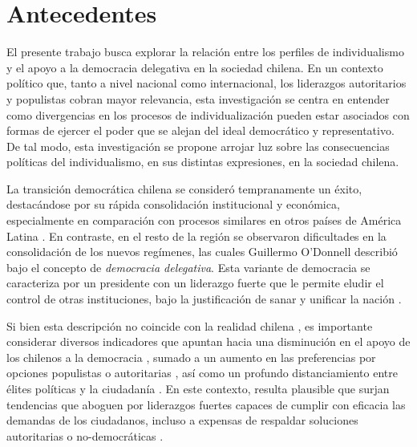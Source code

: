 \documentclass[12pt,twoside]{templates/facsothesis}
\begin{document}
  \listoftables
  \thispagestyle{empty}

  \listoffigures
  \thispagestyle{empty}


\mainmatter %
\titleformat{\chapter}{\normalfont\Huge\bfseries}{\thechapter}{1em}{}
\pagestyle{fancyplain} %

\hypertarget{antecedentes}{%
\chapter{Antecedentes}\label{antecedentes}}

\begin{quote}
\end{quote}

El presente trabajo busca explorar la relación entre los perfiles de individualismo y el apoyo a la democracia delegativa en la sociedad chilena. En un contexto político que, tanto a nivel nacional como internacional, los liderazgos autoritarios y populistas cobran mayor relevancia, esta investigación se centra en entender como divergencias en los procesos de individualización pueden estar asociados con formas de ejercer el poder que se alejan del ideal democrático y representativo. De tal modo, esta investigación se propone arrojar luz sobre las consecuencias políticas del individualismo, en sus distintas expresiones, en la sociedad chilena.

La transición democrática chilena se consideró tempranamente un éxito, destacándose por su rápida consolidación institucional y económica, especialmente en comparación con procesos similares en otros países de América Latina \citep{odonnell1994}. En contraste, en el resto de la región se observaron dificultades en la consolidación de los nuevos regímenes, las cuales Guillermo O'Donnell \citeyearpar{odonnell1994} describió bajo el concepto de \emph{democracia delegativa}. Esta variante de democracia se caracteriza por un presidente con un liderazgo fuerte que le permite eludir el control de otras instituciones, bajo la justificación de sanar y unificar la nación \citep{odonnell1994}.

Si bien esta descripción no coincide con la realidad chilena \citep{odonnell1994}, es importante considerar diversos indicadores que apuntan hacia una disminución en el apoyo de los chilenos a la democracia \citep{cep}, sumado a un aumento en las preferencias por opciones populistas o autoritarias \citep{cadem2023, cerc-mori, diaz2023}, así como un profundo distanciamiento entre élites políticas y la ciudadanía \citep{luna2016}. En este contexto, resulta plausible que surjan tendencias que aboguen por liderazgos fuertes capaces de cumplir con eficacia las demandas de los ciudadanos, incluso a expensas de respaldar soluciones autoritarias o no-democráticas \citep{carlin2018}.
\end{document}
